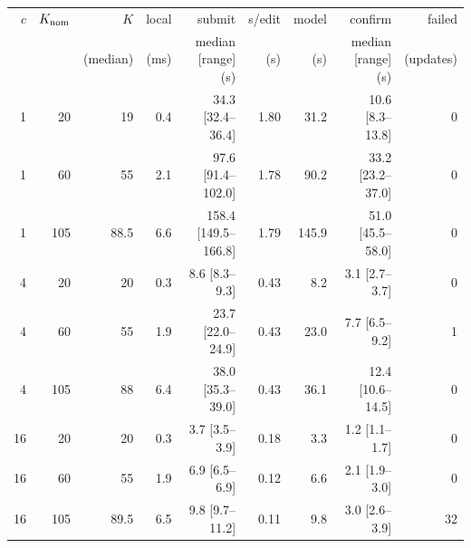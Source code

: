 \begin{tabular}{rrrrrrrrr}
\toprule
$c$ & $K_{\rm nom}$ & $K$ & local & submit & s/edit & model & confirm & failed \\
 & & (median) & (ms) & median [range] (s) & (s) & (s) & median [range] (s) & (updates) \\
\midrule
1 & 20 & 19 & 0.4 & 34.3 [32.4--36.4] & 1.80 & 31.2 & 10.6 [8.3--13.8] & 0 \\
1 & 60 & 55 & 2.1 & 97.6 [91.4--102.0] & 1.78 & 90.2 & 33.2 [23.2--37.0] & 0 \\
1 & 105 & 88.5 & 6.6 & 158.4 [149.5--166.8] & 1.79 & 145.9 & 51.0 [45.5--58.0] & 0 \\
4 & 20 & 20 & 0.3 & 8.6 [8.3--9.3] & 0.43 & 8.2 & 3.1 [2.7--3.7] & 0 \\
4 & 60 & 55 & 1.9 & 23.7 [22.0--24.9] & 0.43 & 23.0 & 7.7 [6.5--9.2] & 1 \\
4 & 105 & 88 & 6.4 & 38.0 [35.3--39.0] & 0.43 & 36.1 & 12.4 [10.6--14.5] & 0 \\
16 & 20 & 20 & 0.3 & 3.7 [3.5--3.9] & 0.18 & 3.3 & 1.2 [1.1--1.7] & 0 \\
16 & 60 & 55 & 1.9 & 6.9 [6.5--6.9] & 0.12 & 6.6 & 2.1 [1.9--3.0] & 0 \\
16 & 105 & 89.5 & 6.5 & 9.8 [9.7--11.2] & 0.11 & 9.8 & 3.0 [2.6--3.9] & 32 \\
\bottomrule
\end{tabular}
